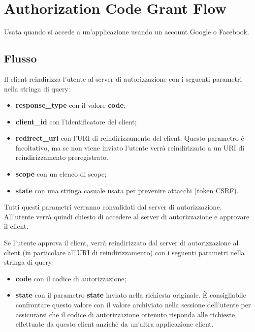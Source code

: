 \section{Authorization Code Grant Flow}
Usata quando si accede a un'applicazione usando un account Google o Facebook.

\subsection{Flusso}
Il client reindirizza l'utente al server di autorizzazione con i seguenti parametri nella stringa di query:
\begin{itemize}
    \item \textbf{response\_type} con il valore \textbf{code};
    \item \textbf{client\_id} con l'identificatore del client;
    \item \textbf{redirect\_uri} con l'URI di reindirizzamento del client. Questo parametro è facoltativo, ma se non viene inviato l'utente verrà reindirizzato a un URI di reindirizzamento preregistrato.
    \item \textbf{scope} con un elenco di scope;
    \item \textbf{state} con una stringa casuale usata per prevenire attacchi (token CSRF). 
\end{itemize}

\noindent Tutti questi parametri verranno convalidati dal server di autorizzazione. All'utente verrà quindi chiesto di accedere al server di autorizzazione e approvare il client.

Se l'utente approva il client, verrà reindirizzato dal server di autorizzazione al client (in particolare all'URI di reindirizzamento) con i seguenti parametri nella stringa di query:
\begin{itemize}
    \item \textbf{code} con il codice di autorizzazione;
    \item \textbf{state} con il parametro \textbf{state} inviato nella richiesta originale. È consigliabile confrontare questo valore con il valore archiviato nella sessione dell'utente per assicurarsi che il codice di autorizzazione ottenuto risponda alle richieste effettuate da questo client anziché da un'altra applicazione client.
\end{itemize}

